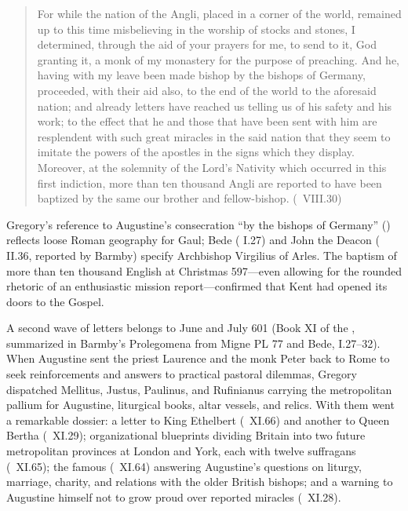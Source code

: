 \begin{quote}
For while the nation of the Angli, placed in a corner of the world, remained up
to this time misbelieving in the worship of stocks and stones, I determined,
through the aid of your prayers for me, to send to it, God granting it, a monk
of my monastery for the purpose of preaching. And he, having with my leave been
made bishop by the bishops of Germany, proceeded, with their aid also, to the
end of the world to the aforesaid nation; and already letters have reached us
telling us of his safety and his work; to the effect that he and those that
have been sent with him are resplendent with such great miracles in the said
nation that they seem to imitate the powers of the apostles in the signs which
they display. Moreover, at the solemnity of the Lord's Nativity which occurred
in this first indiction, more than ten thousand Angli are reported to have been
baptized by the same our brother and fellow-bishop. (\ VIII.30)
\end{quote}

Gregory's reference to Augustine's consecration ``by the bishops of Germany''
() reflects loose Roman geography for Gaul; Bede
( I.27) and John the Deacon ( II.36,
reported by Barmby) specify Archbishop Virgilius of Arles. The baptism of more
than ten thousand English at Christmas 597---even allowing for the rounded
rhetoric of an enthusiastic mission report---confirmed that Kent had opened its
doors to the Gospel.

A second wave of letters belongs to June and July 601 (Book XI of the
, summarized in Barmby's Prolegomena from Migne PL 77 and Bede,
 I.27--32).
When Augustine sent the priest Laurence and the monk Peter back to Rome to seek
reinforcements and answers to practical pastoral dilemmas, Gregory dispatched
Mellitus, Justus, Paulinus, and Rufinianus carrying the metropolitan pallium
for Augustine, liturgical books, altar vessels, and relics. With them went a
remarkable dossier: a letter to King Ethelbert (\ XI.66) and another
to Queen Bertha (\ XI.29); organizational blueprints dividing Britain
into two future metropolitan provinces at London and York, each with twelve
suffragans (\ XI.65); the famous 
(\ XI.64) answering Augustine's questions on liturgy, marriage,
charity, and relations with the older British bishops; and a warning to
Augustine himself not to grow proud over reported miracles (\ XI.28).

